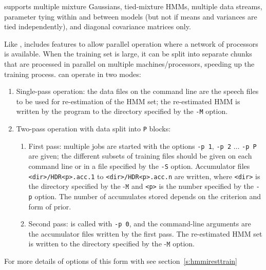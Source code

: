  supports multiple mixture Gaussians, tied-mixture
HMMs, multiple data streams, parameter tying within and between models
(but not if means and variances are tied independently), and diagonal
covariance matrices only.





Like ,  includes features to allow parallel
operation where a network of processors is available. When the training set
is large, it can be split into separate chunks that are processed in
parallel on multiple machines/processors, speeding up the training process.
 can operate in two modes:
\begin{enumerate}
\item Single-pass operation: the data files on the command line are the
  speech files to be used for re-estimation of the HMM set; the re-estimated
  HMM is written by the program to the directory specified by the {\texttt{-M}}
   option.
\item Two-pass operation with data split into \texttt{P} blocks:
   \begin{enumerate}  
     \item First pass: multiple jobs are started with the options \texttt{-p 1}, 
       \texttt{-p 2} $\ldots$ \texttt{-p P} are given; the different subsets of training
     files should be given on each command line or in a file specified by the \texttt{-S}
     option.  Accumulator files \texttt{<dir>/HDR<p>.acc.1} to  \texttt{<dir>/HDR<p>.acc.n} 
      are written, where \texttt{<dir>} is
    the directory specified by the $\texttt{-M}$  and \texttt{<p>} is the number specified
     by the \texttt{-p} option.   The number of accumulates stored depends on
     the criterion and form of prior.
     \item Second pass:  is called with \texttt{-p 0}, and the
      command-line arguments are the accumulator files written by the first pass.
     The re-estimated HMM set is written to the directory specified by the $\texttt{-M}$ option. 
   \end{enumerate}
\end{enumerate}
For more details of options of this form with  see section~\ref{s:hmmiresttrain}

